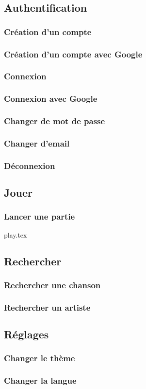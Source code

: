 \subsection{Authentification}
\subsubsection{Création d'un compte}
\subsubsection{Création d'un compte avec Google}
\subsubsection{Connexion}
\subsubsection{Connexion avec Google}
\subsubsection{Changer de mot de passe}
\subsubsection{Changer d'email}
\subsubsection{Déconnexion}

\subsection{Jouer}
\subsubsection{Lancer une partie}
{play.tex}

\subsection{Rechercher}
\subsubsection{Rechercher une chanson}
\subsubsection{Rechercher un artiste}
\subsection{Réglages}
\subsubsection{Changer le thème}
\subsubsection{Changer la langue}